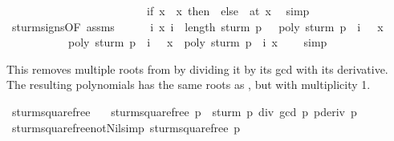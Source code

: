 \begin{isabellebody}
\ \ \ \ \ \ \ \ \ \ \ \ \ \ \ \ \ \ \ \ \ \ \ \ \ {\isacharparenleft}if\ x\ {\isachargreater}\ x\ then\ {}\ else\ {\isacharminus}{}{\isacharparenright}{\isacharparenright}\ {\isacharparenleft}at\ x\ \isamarkupfalse%
\ simp\isanewline
{}\isamarkupfalse%
\isanewline
\ \ \isamarkupfalse%
\ sturm{\isacharunderscore}signs{\isacharbrackleft}OF\ assms{\isacharbrackright}\isanewline
\ \ \ \ \isamarkupfalse%
\ {\isachardoublequoteopen}{\isasymAnd}i\ x{\isachardot}\ {\isasymlbrakk}i\ {\isacharless}\ length\ {\isacharparenleft}sturm\ p{\isacharparenright}\ {\isacharminus}\ {}{\isacharsemicolon}\ poly\ {\isacharparenleft}sturm\ p\ {\isacharbang}\ {\isacharparenleft}i\ {\isacharplus}\ {}{\isacharparenright}{\isacharparenright}\ x\ {\isacharequal}\ {}{\isasymrbrakk}\isanewline
\ \ \ \ \ \ \ \ \ \ {\isasymLongrightarrow}\ poly\ {\isacharparenleft}sturm\ p\ {\isacharbang}\ {\isacharparenleft}i\ {\isacharplus}\ {}{\isacharparenright}{\isacharparenright}\ x\ {\isacharasterisk}\ poly\ {\isacharparenleft}sturm\ p\ {\isacharbang}\ i{\isacharparenright}\ x\ {\isacharless}\ {}{\isachardoublequoteclose}\ \isamarkupfalse%
\ simp\isanewline
{}\isamarkupfalse%
%
\endisatagproof
{\isafoldproof}%
%
\isadelimproof
%
\endisadelimproof
%
\isamarkuptrue%
%
\begin{isamarkuptext}%
This removes multiple roots from  by dividing it by 
  its gcd with its derivative. The resulting polynomials has the same 
  roots as , but with multiplicity 1.%
\end{isamarkuptext}%
\isamarkuptrue%
\isamarkupfalse%
\ sturm{\isacharunderscore}squarefree\ \isanewline
\ \ {\isachardoublequoteopen}sturm{\isacharunderscore}squarefree\ p\ {\isacharequal}\ sturm\ {\isacharparenleft}p\ div\ {\isacharparenleft}gcd\ p\ {\isacharparenleft}pderiv\ p{\isacharparenright}{\isacharparenright}{\isacharparenright}{\isachardoublequoteclose}\isanewline
\isanewline
{}\isamarkupfalse%
\ sturm{\isacharunderscore}squarefree{\isacharunderscore}not{\isacharunderscore}Nil{\isacharbrackleft}simp{\isacharbrackright}{\isacharcolon}\ {\isachardoublequoteopen}sturm{\isacharunderscore}squarefree\ p\ {\isasymnoteq}\ {\isacharbrackleft}{\isacharbrackright}{\isachardoublequoteclose}\isanewline

\end{isabellebody}
